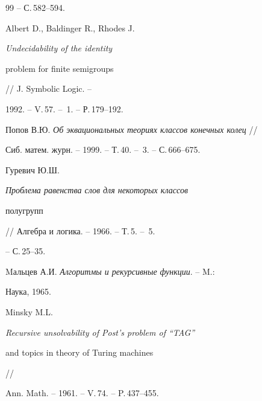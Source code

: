 \begin{thebibliography}{99}
-- С.\,582--594. 




Albert D., Baldinger R., Rhodes J. {\em Undecidability of the identity 


problem for finite semigroups} // J. Symbolic Logic. -- 


1992. -- V.\,57. -- \No\,1. -- Р.\,179--192. 




Попов В.Ю. {\em Об эквациональных теориях классов конечных колец} // 


Сиб. матем. журн. -- 1999. -- Т.\,40. -- \No\,3. -- С.\,666--675. 




Гуревич Ю.Ш. {\em Проблема равенства слов для некоторых классов 


полугрупп} // Алгебра и логика. -- 1966. -- Т.\,5. -- \No\,5. 


-- С.\,25--35. 




Mальцев А.И. {\em Алгоритмы и рекурсивные функции}. -- M.: 


Наука, 1965.




Minsky M.L. {\em Recursive unsolvability of Post's problem of ``TAG'' 


and topics in theory of Turing machines} // 


Ann. Math. -- 1961. -- V.\,74. -- P.\,437--455. 


 


\end{thebibliography} 


 


\vskip 2cm 


 






 


\label{end} 


 


